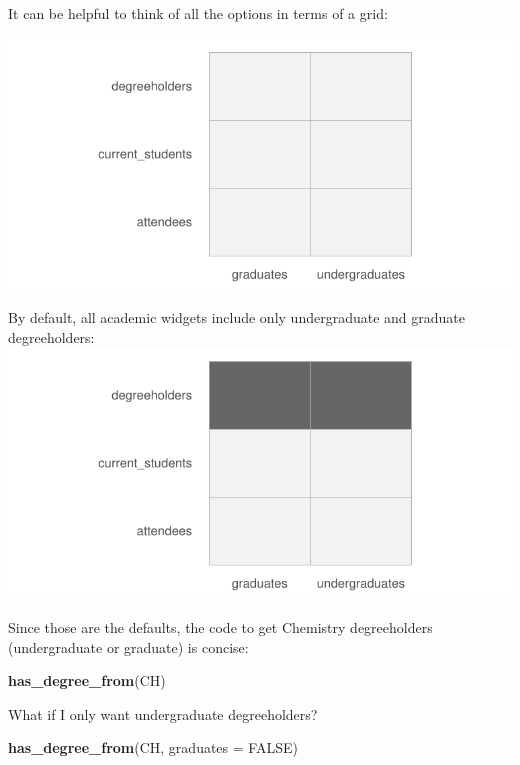 \documentclass[]{book}
\newenvironment{Shaded}{\begin{snugshade}}{\end{snugshade}}
\newcommand{\DataTypeTok}[1]{\textcolor[rgb]{0.13,0.29,0.53}{#1}}
\newcommand{\KeywordTok}[1]{\textcolor[rgb]{0.13,0.29,0.53}{\textbf{#1}}}
\newcommand{\NormalTok}[1]{#1}
\newcommand{\OtherTok}[1]{\textcolor[rgb]{0.56,0.35,0.01}{#1}}
\begin{document}
It can be helpful to think of all the options in terms of a grid:

\includegraphics{images/unnamed-chunk-27-1.pdf}

By default, all academic widgets include only undergraduate and graduate degreeholders:
\includegraphics{images/unnamed-chunk-28-1.pdf}

Since those are the defaults, the code to get Chemistry degreeholders (undergraduate or graduate) is concise:

\begin{Shaded}
\begin{Highlighting}[]
\KeywordTok{has_degree_from}\NormalTok{(CH)}
\end{Highlighting}
\end{Shaded}

What if I only want undergraduate degreeholders?

\begin{Shaded}
\begin{Highlighting}[]
\KeywordTok{has_degree_from}\NormalTok{(CH, }\DataTypeTok{graduates =} \OtherTok{FALSE}\NormalTok{)}
\end{Highlighting}
\end{Shaded}
\end{document}
